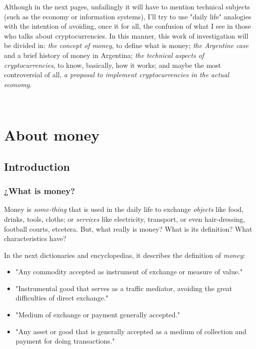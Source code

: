 \documentclass[12pt,a4paper,twoside]{book}
\begin{document}
Although in the next pages, unfailingly it will have to mention technical subjects (such as the economy or information systems), I'll try to use "daily life" analogies with the intention of avoiding, once it for all, the confusion of what I see in those who talks about cryptocurrencies. In this manner, this work of investigation will be divided in: \textit{the concept of money}, to define what is money; \textit{the Argentine case} and a brief history of money in Argentina; \textit{the technical aspects of cryptocurrencies}, to know, basically, how it works; and maybe the most controversial of all, \textit{a proposal to implement cryptocurrencies in the actual economy}.

\newpage

\setcounter{secnumdepth}{1}
\thispagestyle{empty}
\
\renewcommand{\thepage}{\arabic{page}}

\part{About money}

\chapter{Introduction}

\section{¿What is money?}
Money is \textit{some-thing} that is used in the daily life to exchange \textit{objects} like food, drinks, tools, cloths; or \textit{services} like electricity, transport, or even hair-dressing, football courts, etcetera. But, what really is money? What is its definition? What characteristics have?

In the next dictionaries and encyclopedias, it describes the definition of \textit{money}:

\begin{itemize}
\item "Any commodity accepted as instrument of exchange or measure of value." \cite[p. 3807]{dic:espasacalpe}
\item "Instrumental good that serves as a traffic mediator, avoiding the great difficulties of direct exchange." \cite{dic:clarin}
\item "Medium of exchange or payment generally accepted." \cite{rae}
\item "Any asset or good that is generally accepted as a medium of collection and payment for doing transactions." \cite{epedia:dinero}
\end{itemize}
\end{document}
